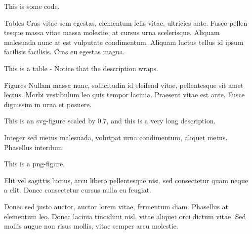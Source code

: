 \documentclass{ieee_modern}
\begin{document}
    {This is some code.}

\h{Tables}
Cras vitae sem egestas, elementum felis vitae, ultricies ante. Fusce pellen tesque massa vitae massa molestie, at cursus urna scelerisque. Aliquam malesuada nunc at est vulputate condimentum. Aliquam luctus tellus id ipsum facilisis facilisis. Cras eu egestas magna.

    {This is a table - Notice that the description wraps.}

\h{Figures}
Nullam massa nunc, sollicitudin id eleifend vitae, pellentesque sit amet lectus. Morbi vestibulum leo quis tempor lacinia. Praesent vitae est ante. Fusce dignissim in urna et posuere.

    {This is an svg-figure scaled by 0.7, and this is a very long description.}

Integer sed metus malesuada, volutpat urna condimentum, aliquet metus. Phasellus interdum.

    {This is a png-figure.}

 Elit vel sagittis luctus, arcu libero pellentesque nisi, sed consectetur quam neque a elit. Donec consectetur cursus nulla eu feugiat.


Donec sed justo auctor, auctor lorem vitae, fermentum diam. Phasellus at elementum leo. Donec lacinia tincidunt nisl, vitae aliquet orci dictum vitae. Sed mollis augue non risus mollis, vitae semper arcu molestie.
\end{document}
